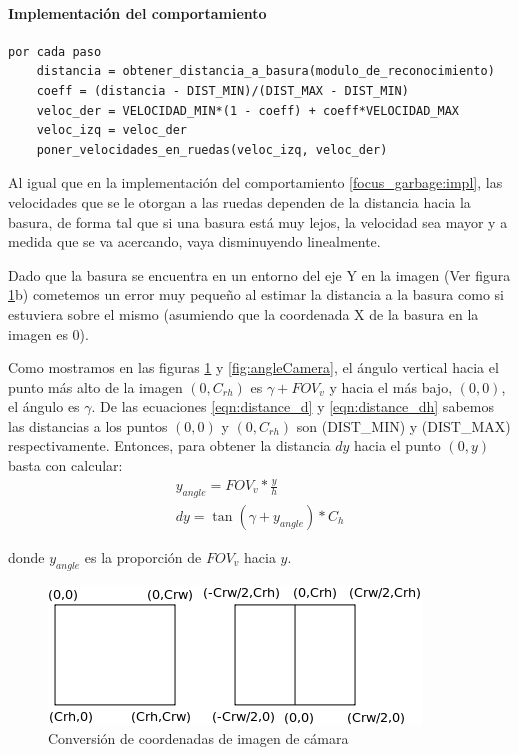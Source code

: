 \paragraph{Implementaci\'on del comportamiento}
\label{go_to_garbage:impl}
\begin{verbatim}
por cada paso
    distancia = obtener_distancia_a_basura(modulo_de_reconocimiento)
    coeff = (distancia - DIST_MIN)/(DIST_MAX - DIST_MIN)
    veloc_der = VELOCIDAD_MIN*(1 - coeff) + coeff*VELOCIDAD_MAX
    veloc_izq = veloc_der
    poner_velocidades_en_ruedas(veloc_izq, veloc_der)
\end{verbatim}

Al igual que en la implementaci\'on del comportamiento \ref{focus_garbage:impl},
las velocidades que se le otorgan a las ruedas dependen de la distancia
hacia la basura, de forma tal que si una basura est\'a muy lejos, la velocidad
sea mayor y a medida que se va acercando, vaya disminuyendo linealmente.

Dado que la basura se encuentra en un entorno del eje Y en la imagen (Ver figura
\ref{fig:image_coord_conv}b) cometemos un error muy peque\~no al estimar la
distancia a la basura como si estuviera sobre el mismo (asumiendo que la
coordenada X de la basura en la imagen es 0).

Como mostramos en las figuras \ref{fig:image_coord_conv} y
\ref{fig:angleCamera}, el \'angulo vertical hacia el punto m\'as alto de la
imagen $(0,C_{rh})$ es $\gamma+FOV_v$ y hacia el m\'as bajo, $(0,0)$, el
\'angulo es $\gamma$. De las ecuaciones \eqref{eqn:distance_d} y
\eqref{eqn:distance_dh} sabemos las distancias a los puntos $(0,0)$ y
$(0,C_{rh})$ son (DIST\_MIN) y (DIST\_MAX) respectivamente.
Entonces, para obtener la distancia $dy$ hacia el punto $(0,y)$ basta con
calcular:
\begin{eqnarray}
y_{angle} = FOV_v * \frac{y}{h} \\
dy = \tan(\gamma + y_{angle}) * C_h
\end{eqnarray}

donde $y_{angle}$ es la proporci\'on de $FOV_v$ hacia $y$.
\begin{figure}[htp]
\begin{center}
\includegraphics[scale=0.5]{comportamientos/imageCoordsConvertion.png}
\caption{Conversi\'on de coordenadas de imagen de c\'amara}
\label{fig:image_coord_conv}
\end{center}
\end{figure}

